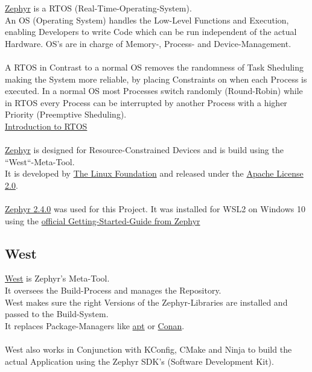 \href{https://zephyrproject.org/}{Zephyr} is a RTOS (Real-Time-Operating-System).
\\
An OS (Operating System) handles the Low-Level Functions and Execution, enabling
Developers to write Code which can be run independent of the actual Hardware.
OS's are in charge of Memory-, Process- and Device-Management.
\\
\\
A RTOS in Contrast to a normal OS removes the randomness of Task Sheduling
making the System more reliable, by placing Constraints on when each Process
is executed. In a normal OS most Processes switch randomly (Round-Robin) while in RTOS
every Process can be interrupted by another Process with a higher Priority (Preemptive Sheduling).
\\
\href{https://predictabledesigns.com/introduction-to-real-time-operating-systems-rtos-for-use-in-embedded-systems/}
{Introduction to RTOS}
\\
\\
\href{https://zephyrproject.org/}{Zephyr} is designed for Resource-Constrained
Devices and is build using the ``West``-Meta-Tool.
\\
It is developed by
\href{https://www.linuxfoundation.org/}
{The Linux Foundation} and released under the
\href{https://www.apache.org/licenses/LICENSE-2.0.html}
{Apache License 2.0}.
\\
\\
\href{https://docs.zephyrproject.org/2.4.0/index.html}
{Zephyr 2.4.0} was used for this Project.
It was installed for WSL2 on Windows 10 using the
\href{https://docs.zephyrproject.org/2.4.0/getting_started/index.html}
{official Getting-Started-Guide from Zephyr}

\subsection{West}

\href{https://docs.zephyrproject.org/2.4.0/guides/west/index.html}
{West} is Zephyr's Meta-Tool.
\\
It oversees the Build-Process and manages the Repository.
\\
West makes sure the right Versions of the Zephyr-Libraries are installed and
passed to the Build-System.
\\
It replaces Package-Managers like
\href{https://en.wikipedia.org/wiki/APT_(software)}{apt}
or
\href{https://conan.io/}{Conan}.
\\
\\
West also works in Conjunction with KConfig, CMake and Ninja to build the actual
Application using the Zephyr SDK's (Software Development Kit).

